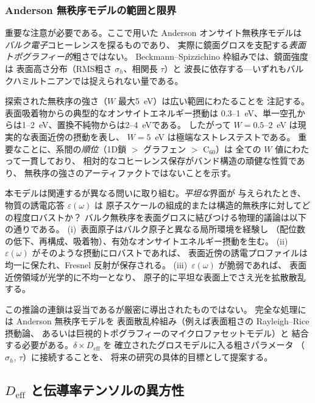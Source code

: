\documentclass[twocolumn,showpacs,preprintnumbers,amsmath,amssymb,prb]{revtex4-2}
\begin{document}
\subsubsection{Anderson 無秩序モデルの範囲と限界}

重要な注意が必要である。ここで用いた Anderson オンサイト無秩序モデルは
\emph{バルク電子}コヒーレンスを探るものであり、
実際に鏡面グロスを支配する\emph{表面トポグラフィー的}粗さではない。
Beckmann--Spizzichino 枠組みでは、鏡面強度は
表面高さ分布（RMS粗さ $\sigma_h$、相関長 $\tau$）と
波長に依存する---いずれもバルクハミルトニアンでは捉えられない量である。

探索された無秩序の強さ（$W$ 最大5~eV）は広い範囲にわたることを
注記する。表面吸着物からの典型的なオンサイトエネルギー摂動は
0.3--1~eV、単一空孔からは1--2~eV、置換不純物からは2--4~eVである。
したがって $W = 0.5$--$2$~eV は現実的な表面近傍の摂動を表し、
$W = 5$~eV は極端なストレステストである。
重要なことに、系間の\emph{順位}（1D鎖 $>$ グラフェン $>$ C$_{60}$）は
全ての $W$ 値にわたって一貫しており、
相対的なコヒーレンス保存がバンド構造の頑健な性質であり、
無秩序の強さのアーティファクトではないことを示す。

本モデルは関連するが異なる問いに取り組む。\emph{平坦な}界面が
与えられたとき、物質の誘電応答 $\varepsilon(\omega)$ は
原子スケールの組成的または構造的無秩序に対してどの程度ロバストか？
バルク無秩序を表面グロスに結びつける物理的議論は以下の通りである。
(i)~表面原子はバルク原子と異なる局所環境を経験し
（配位数の低下、再構成、吸着物）、有効なオンサイトエネルギー摂動を生む。
(ii)~$\varepsilon(\omega)$ がそのような摂動にロバストであれば、
表面近傍の誘電プロファイルは均一に保たれ、Fresnel 反射が保存される。
(iii)~$\varepsilon(\omega)$ が脆弱であれば、
表面近傍領域が光学的に不均一となり、
原子的に平坦な表面上でさえ光を拡散散乱する。

この推論の連鎖は妥当であるが厳密に導出されたものではない。
完全な処理には Anderson 無秩序モデルを
表面散乱枠組み（例えば表面粗さの Rayleigh--Rice 摂動論、
あるいは巨視的トポグラフィーのマイクロファセットモデル）と
結合する必要がある。$\delta \times D_\mathrm{eff}$ を
確立されたグロスモデルに入る粗さパラメータ
（$\sigma_h$, $\tau$）に接続することを、
将来の研究の具体的目標として提案する。

\subsection{$D_\mathrm{eff}$ と伝導率テンソルの異方性}
\end{document}
